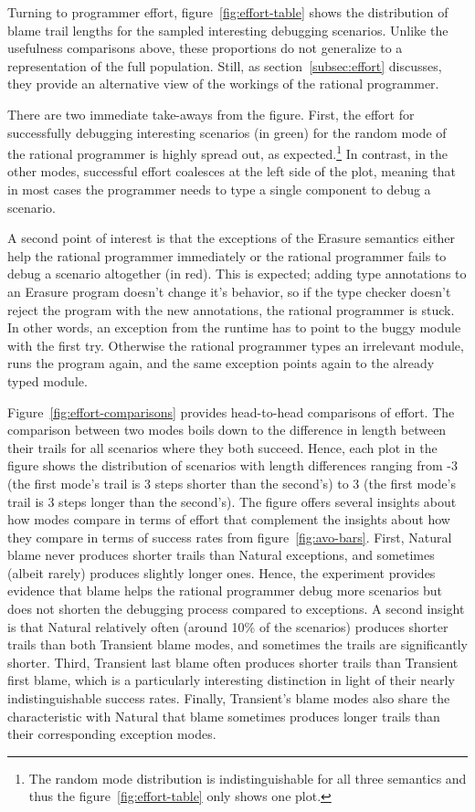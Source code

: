 Turning to programmer effort, figure~\ref{fig:effort-table} shows the
distribution of blame trail lengths for the sampled interesting debugging
scenarios. Unlike the usefulness comparisons above, these proportions do
not generalize to a representation of the full population.  Still, as
section~\ref{subsec:effort} discusses, they provide an alternative view of
the workings of the rational programmer. 

There are two immediate take-aways from the figure. First, the effort for
successfully debugging interesting scenarios (in green) for the random
mode of the rational programmer is highly spread out, as
expected.\footnote{The random mode distribution is indistinguishable for
all three semantics and thus the figure~\ref{fig:effort-table} only shows
one plot.} In contrast, in the other modes, successful effort coalesces at
the left side of the plot, meaning that in most cases the programmer needs
to type a single component to debug a scenario. 

A second point of interest is that the exceptions of the Erasure semantics
either help the rational programmer immediately or the rational programmer
fails to debug a scenario altogether (in red).  This is expected; adding
type annotations to an Erasure program doesn't change it's behavior, so if
the type checker doesn't reject the program with the new annotations, the
rational programmer is stuck.  In other words, an exception from the
runtime has to point to the buggy module with the first try. Otherwise the
rational programmer types an irrelevant module, runs the program again,
and the same exception points again to the already typed module. 

Figure~\ref{fig:effort-comparisons} provides head-to-head comparisons of
effort.  The comparison between two modes boils down to the difference in
length between their trails for all scenarios where they both succeed.
Hence, each plot in the figure shows the distribution of scenarios with
length differences ranging from -3 (the first mode's trail is 3 steps
shorter than the second's) to 3 (the first mode's trail is 3 steps longer
than the second's).  The figure offers several insights about how  modes
compare in terms of effort that complement the insights about how they
compare in terms of success rates from figure~\ref{fig:avo-bars}.  First,
Natural blame never produces shorter trails than Natural exceptions, and
sometimes (albeit rarely) produces slightly longer ones.  Hence, the
experiment provides evidence that blame helps the rational programmer
debug more scenarios but does not shorten the debugging process compared
to exceptions. A second insight is that Natural relatively often (around 10\% of the
scenarios) produces shorter trails than both Transient blame modes, and
sometimes the trails are significantly shorter.  Third, Transient last
blame often produces shorter trails than Transient first blame, which is a
particularly interesting distinction in light of their nearly
indistinguishable success rates.  Finally, Transient's blame modes also
share the characteristic with Natural that blame sometimes produces longer
trails than their corresponding exception modes.

